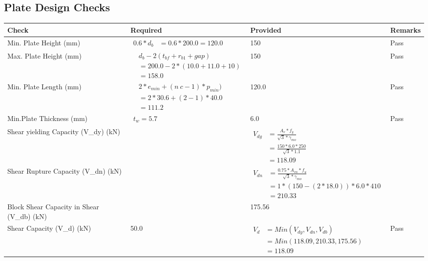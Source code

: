 \documentclass{article}%
\begin{document}
\subsection{Plate Design Checks}%
\label{subsec:PlateDesignChecks}%
\renewcommand{\arraystretch}{1.2}%
\begin{longtable}{|p{4cm}|p{5cm}|p{5.5cm}|p{1.5cm}|}%
\hline%
\rowcolor{OsdagGreen}%
Check&Required&Provided&Remarks\\%
\hline%
\endhead%
\hline%
Min. Plate Height (mm)&$\begin{aligned}0.6 * d_b&= 0.6 * 200.0=120.0\end{aligned}$&150&Pass\\%
\hline%
Max. Plate Height (mm)&$\begin{aligned} &d_b - 2 (t_{bf} + r_{b1} + gap)\\ &=200.0- 2* (10.0+11.0+ 10)\\ &=158.0\end{aligned}$&150&Pass\\%
\hline%
Min. Plate Length (mm)&$\begin{aligned} &2*e_{min} + (n~c-1) * p_{min})\\ &=2*30.6+(2-1) * 40.0\\ &=111.2\end{aligned}$&120.0&Pass\\%
\hline%
Min.Plate Thickness (mm)&$\begin{aligned} t_w=5.7\end{aligned}$&6.0&Pass\\%
\hline%
Shear yielding Capacity (V\_dy) (kN)&&$\begin{aligned} V_{dg} &= \frac{A_v*f_y}{\sqrt{3}*\gamma_{mo}}\\ &=\frac{150*6.0*250}{\sqrt{3}*1.1}\\ &=118.09\end{aligned}$&\\%
\hline%
Shear Rupture Capacity (V\_dn) (kN)&&$\begin{aligned} V_{dn} &= \frac{0.75*A_{vn}*f_u}{\sqrt{3}*\gamma_{mo}}\\ &=1*(150-(2*18.0))*6.0*410\\ &=210.33\end{aligned}$&\\%
\hline%
Block Shear Capacity in Shear (V\_db) (kN)&&175.56&\\%
\hline%
Shear Capacity (V\_d) (kN)&50.0&$\begin{aligned} V_d &= Min(V_{dy},V_{dn},V_{db})\\ &= Min(118.09,210.33,175.56)\\ &=118.09\end{aligned}$&Pass\\%

\end{longtable}
\end{document}
